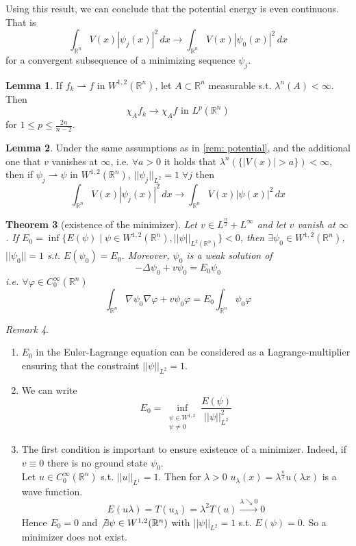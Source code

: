 \documentclass[a4paper, 12pt]{article}
\theoremstyle{plain}
\newtheorem{theorem}{Theorem}[section] %
\theoremstyle{definition}
\theoremstyle{lemma}
\newtheorem{lemma}[theorem]{Lemma}
\theoremstyle{remark}
\newtheorem{remark}[theorem]{Remark}
\theoremstyle{corollary}
\theoremstyle{example}
\begin{document}
	Using this result, we can conclude that the potential energy is even continuous. That is \[\int_{\mathbb{R}^n} V(x)\left|\psi_j(x)\right|^2 \, dx \to \int_{\mathbb{R}^n} V(x) \left|\psi_0(x)\right|^2 \, dx\] for a convergent subsequence of a minimizing sequence $\psi_j$.
	\begin{lemma}
		If $f_k \rightharpoonup f$ in $W^{1,2}(\mathbb{R}^n)$, let $A\subset \mathbb{R}^n$ measurable s.t. $\lambda^n(A) < \infty$. Then \[\chi_A f_k \to \chi_A f \text{ in } L^{p}(\mathbb{R}^n)\] for $1\leq p \leq \frac{2n}{n-2}$.
	\end{lemma}
	\begin{lemma}
		Under the same assumptions as in \ref{rem: potential}, and the additional one that $v$ vanishes at $\infty$, i.e. $\forall a >0$ it holds that $\lambda^n(\{\left|V(x)\right|>a\}) < \infty$, then if $\psi_j \rightharpoonup \psi$ in $W^{1,2}(\mathbb{R}^n)$, $||\psi_j||_{L^2} = 1 \; \forall j$ then \[\int_{\mathbb{R}^n} V(x) \left|\psi_j(x)\right|^2 \, dx \to \int_{\mathbb{R}^n} V(x) \left|\psi(x)\right|^2 \, dx\]
	\end{lemma}
	\begin{theorem}[existence of the minimizer]
		Let $v \in L^{\frac{n}{2}} + L^\infty$ and let $v$ vanish at $\infty$. If $E_0 = \inf\{E(\psi) \mid \psi \in W^{1,2}(\mathbb{R}^n), ||\psi||_{L^2(\mathbb{R}^n)}\} <0$, then $\exists \psi_0 \in W^{1,2}(\mathbb{R}^n)$, $||\psi_0||=1$ s.t. $E(\psi_0) = E_0$. Moreover, $\psi_0$ is a weak solution of \[-\Delta \psi_0 + v\psi_0 = E_0\psi_0\] i.e. $\forall \varphi \in C_0^\infty(\mathbb{R}^n)$ \[\int_{\mathbb{R}^n} \nabla \psi_0 \nabla \varphi + v\psi_0 \varphi = E_0 \int_{\mathbb{R}^n} \psi_0 \varphi\]
	\end{theorem}
	\begin{remark}
		\begin{enumerate}
			\item $E_0$ in the Euler-Lagrange equation can be considered as a Lagrange-multiplier ensuring that the constraint $||\psi||_{L^2}=1$.
			\item We can write \[E_0 = \inf_{\substack{\psi \in W^{1,2}\\ \psi \neq 0}} \frac{E(\psi)}{||\psi||_{L^2}^2}\]
			\item The first condition is important to ensure existence of a minimizer. Indeed, if $v\equiv 0$ there is no ground state $\psi_0$.\\
			Let $u \in C_0^\infty(\mathbb{R}^n)$ s.t. $||u||_{L^1} = 1$. Then for $\lambda > 0$ $u_\lambda(x) = \lambda^{\frac{n}{2}}u(\lambda x)$ is a wave function. $$E(u\lambda) = T(u_\lambda)=\lambda^2T(u) \overset{\lambda \searrow 0}{\to} 0$$ Hence $E_0=0$ and $\not \exists \psi \in W^{1,2}(\mathbb{R}^n)$ with $||\psi||_{L^2}=1$ s.t. $E(\psi) = 0$. So a minimizer does not exist.
		\end{enumerate}
	\end{remark}
\end{document}
